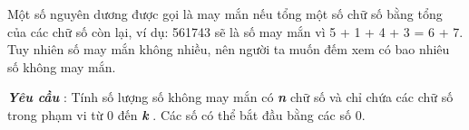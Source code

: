 Một số nguyên dương được gọi là may mắn nếu tổng một số chữ số bằng tổng của các chữ số còn lại, ví dụ: 561743 sẽ là số may mắn vì 5 + 1 + 4 + 3 = 6 + 7. Tuy nhiên số may mắn không nhiều, nên người ta muốn đếm xem có bao nhiêu số không may mắn.  

\textbf{\emph{     Yêu cầu    }}   : Tính số lượng số không may mắn có   \textbf{\emph{     n    }}   chữ số và chỉ chứa các chữ số trong phạm vi từ 0 đến   \textbf{\emph{     k    }}   . Các số có thể bắt đầu bằng các số 0.  

\